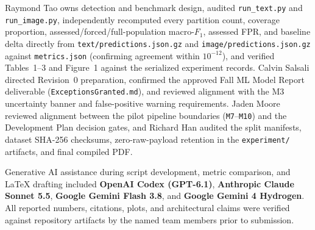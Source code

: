 \documentclass[11pt]{article}
\begin{document}
Raymond Tao owns detection and benchmark design, audited \texttt{run\_text.py} and \texttt{run\_image.py}, independently recomputed every partition count, coverage proportion, assessed/forced/full-population macro-$F_1$, assessed FPR, and baseline delta directly from \texttt{text/\allowbreak{}predictions.json.gz} and \texttt{image/\allowbreak{}predictions.json.gz} against \texttt{metrics.json} (confirming agreement within $10^{-12}$), and verified Tables~1--3 and Figure~1 against the serialized experiment records. Calvin Salsali directed Revision~0 preparation, confirmed the approved Fall ML Model Report deliverable (\texttt{ExceptionsGranted.md}), and reviewed alignment with the M3 uncertainty banner and false-positive warning requirements. Jaden Moore reviewed alignment between the pilot pipeline boundaries (\texttt{M7}--\texttt{M10}) and the Development Plan decision gates, and Richard Han audited the split manifests, dataset SHA-256 checksums, zero-raw-payload retention in the \texttt{experiment/} artifacts, and final compiled PDF.

Generative AI assistance during script development, metric comparison, and \LaTeX{} drafting included \textbf{OpenAI Codex (GPT-6.1)}, \textbf{Anthropic Claude Sonnet 5.5}, \textbf{Google Gemini Flash 3.8}, and \textbf{Google Gemini 4 Hydrogen}. All reported numbers, citations, plots, and architectural claims were verified against repository artifacts by the named team members prior to submission.


\end{document}
